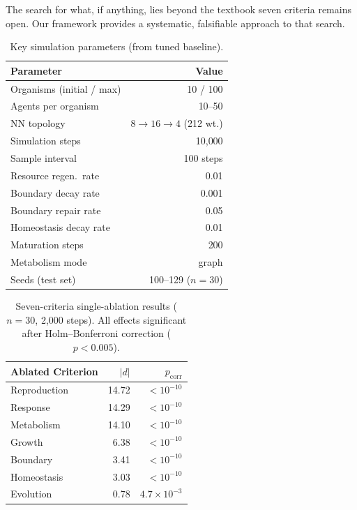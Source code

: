 \documentclass[letterpaper]{article}
\begin{document}
The search for what, if anything, lies beyond the textbook seven criteria
remains open.  Our framework provides a systematic, falsifiable approach
to that search.



\begin{table}[t]
\centering
\caption{Key simulation parameters (from tuned baseline).}
\label{tab:params}
\small
\begin{tabular}{@{}lr@{}}
\toprule
\textbf{Parameter} & \textbf{Value} \\
\midrule
Organisms (initial / max) & 10 / 100 \\
Agents per organism & 10--50 \\
NN topology & $8 \to 16 \to 4$ (212 wt.) \\
Simulation steps & 10{,}000 \\
Sample interval & 100 steps \\
Resource regen.\ rate & 0.01 \\
Boundary decay rate & 0.001 \\
Boundary repair rate & 0.05 \\
Homeostasis decay rate & 0.01 \\
Maturation steps & 200 \\
Metabolism mode & graph \\
Seeds (test set) & 100--129 ($n=30$) \\
\bottomrule
\end{tabular}
\end{table}

\begin{table}[t]
\centering
\caption{Seven-criteria single-ablation results ($n=30$, 2{,}000 steps).
All effects significant after Holm--Bonferroni correction ($p < 0.005$).}
\label{tab:7criteria}
\small
\begin{tabular}{@{}lrr@{}}
\toprule
\textbf{Ablated Criterion} & \textbf{$|d|$} & \textbf{$p_\mathrm{corr}$} \\
\midrule
Reproduction    & 14.72 & $< 10^{-10}$ \\
Response        & 14.29 & $< 10^{-10}$ \\
Metabolism      & 14.10 & $< 10^{-10}$ \\
Growth          &  6.38 & $< 10^{-10}$ \\
Boundary        &  3.41 & $< 10^{-10}$ \\
Homeostasis     &  3.03 & $< 10^{-10}$ \\
Evolution       &  0.78 & $4.7 \times 10^{-3}$ \\
\bottomrule
\end{tabular}
\end{table}
\end{document}
